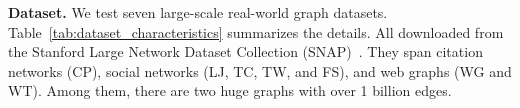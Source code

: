 

\textbf{Dataset.}
We test seven large-scale real-world graph datasets.
Table~\ref{tab:dataset_characteristics} summarizes the details. 
All downloaded from the Stanford Large Network Dataset Collection (SNAP)~\cite{snapnets}. They span citation networks (CP), social networks (LJ, TC, TW, and FS),
and web graphs (WG and WT). %
Among them, there are two huge graphs with over 1 billion edges.



